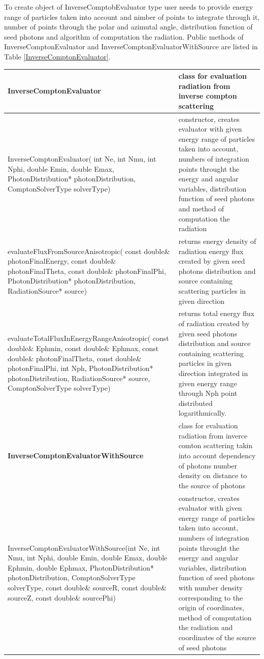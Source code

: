 To create object of InverseComptobEvaluator type user needs to provide energy range of particles taken into account and nimber of points to integrate through it, number of points through the polar and azimutal angle, distribution function of seed photons and algorithm of computation the radiation. Public methods of InverseComptonEvaluator and InverseComptonEvaluatorWithSource are listed in Table \ref{InverseComptonEvaluator}.
\begin{small}
	\label{InverseComptonEvaluator}
	\begin{xtabular}{|p{0.5\textwidth}|p{0.5\textwidth}|} 
		\hline
		\textbf{InverseComptonEvaluator} & class for evaluation radiation from inverse compton scattering\\
		\hline
		InverseComptonEvaluator( int Ne, int Nmu, int Nphi, double Emin, double Emax, PhotonDistribution* photonDistribution, ComptonSolverType solverType) & constructor, creates evaluator with given energy range of particles taken into account, numbers of integration points throught the energy and angular variables, distribution function of seed photons and method of computation the radiation\\
		\hline
		evaluateFluxFromSourceAnisotropic( const double\& photonFinalEnergy, const double\& photonFinalTheta, const double\& photonFinalPhi, PhotonDistribution* photonDistribution, RadiationSource* source) & returns energy density of radiation energy flux created by given seed photons distribution and source containing scattering particles in given direction\\
		\hline
		evaluateTotalFluxInEnergyRangeAnisotropic( const double\& Ephmin, const double\& Ephmax, const double\& photonFinalTheta, const double\& photonFinalPhi, int Nph, PhotonDistribution* photonDistribution, RadiationSource* source, ComptonSolverType solverType) & returns total energy flux of radiation created by given seed photons distribution and source containing scattering particles in given direction integrated in given energy range through Nph point distributed logarithmically.\\
		\hline
		\textbf{InverseComptonEvaluatorWithSource} & class for evaluation radiation from inverce comton scattering takin into account dependency of photons number density on distance to the source of photons\\
		\hline
		InverseComptonEvaluatorWithSource(int Ne, int Nmu, int Nphi, double Emin, double Emax, double Ephmin, double Ephmax, PhotonDistribution* photonDistribution, ComptonSolverType solverType, const double\& sourceR, const double\& sourceZ, const double\& sourcePhi) & constructor, creates evaluator with given energy range of particles taken into account, numbers of integration points throught the energy and angular variables, distribution function of seed photons with number density corresponding to the origin of coordinates, method of computation the radiation and coordinates of the source of seed photons\\
		\hline
	\end{xtabular}
\end{small}

